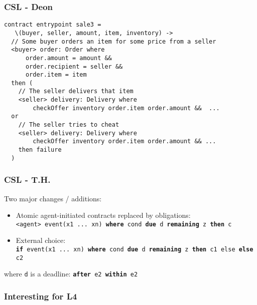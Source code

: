 \documentclass{beamer}
\begin{document}
\begin{frame}[fragile]\frametitle{CSL - Deon}

\small
\begin{verbatim}
contract entrypoint sale3 = 
   \(buyer, seller, amount, item, inventory) ->
  // Some buyer orders an item for some price from a seller
  <buyer> order: Order where
      order.amount = amount &&
      order.recipient = seller &&
      order.item = item
  then (
    // The seller delivers that item
    <seller> delivery: Delivery where
        checkOffer inventory order.item order.amount &&  ...
  or
    // The seller tries to cheat
    <seller> delivery: Delivery where
        checkOffer inventory order.item order.amount && ...
    then failure
  )
\end{verbatim}
\normalsize


\end{frame}


\begin{frame}[fragile]\frametitle{CSL - T.H.}

  Two major changes / additions:
  \begin{itemize}
  \item Atomic agent-initiated contracts replaced by obligations:\\
    \texttt{<agent> event(x1 ... xn) \textbf{where} cond \textbf{due} d \textbf{remaining} z \textbf{then} c}
  \item External choice:\\
    \texttt{\textbf{if} event(x1 ... xn)  \textbf{where} cond \textbf{due} d
      \textbf{remaining} z \textbf{then} c1 else \textbf{else} c2}
  \end{itemize}
  where \texttt{d} is a deadline: \texttt{\textbf{after} e2 \textbf{within} e2}


\end{frame}



\begin{frame}[fragile]\frametitle{Interesting for L4}


\end{frame}


\begin{frame}[fragile]\frametitle{}


\end{frame}


\end{document}
